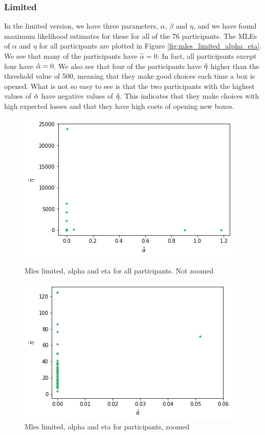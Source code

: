 \subsubsection{Limited}
In the limited version, we have three parameters, $\alpha$, $\beta$ and $\eta$, and we have found maximum likelihood estimates for these for all of the 76 participants. The MLEs of $\alpha$ and $\eta$ for all participants are plotted in Figure \ref{fig:mles_limited_alpha_eta}. We see that many of the participants have $\hat{\alpha}=0$. In fact, all participants except four have $\hat{\alpha}=0$. We also see that four of the participants have $\hat{\eta}$ higher than the threshold value of 500, meaning that they make good choices each time a box is opened. What is not so easy to see is that the two participants with the highest values of $\hat{\alpha}$ have negative values of $\hat{\eta}$. This indicates that they make choices with high expected losses and that they have high costs of opening new boxes. 
\begin{figure}
    \centering
    \begin{minipage}{0.48\textwidth}
        \centering
        \includegraphics[scale=0.38]{pictures/plotted_mles_limited_alpha_eta_gk1.png}
        \caption{Mles limited, alpha and eta for all participants. Not zoomed}
        \label{fig:mles_limited_alpha_eta}
    \end{minipage}\hfill
    \begin{minipage}{0.48\textwidth}
        \centering
        \includegraphics[scale=0.38]{pictures/plotted_mles_limited_alpha_eta_gk1_zoomed.png}
        \caption{Mles limited, alpha and eta for participants, zoomed}
        \label{fig:mles_limited_alpha_eta_zoomed}
    \end{minipage}
\end{figure}

